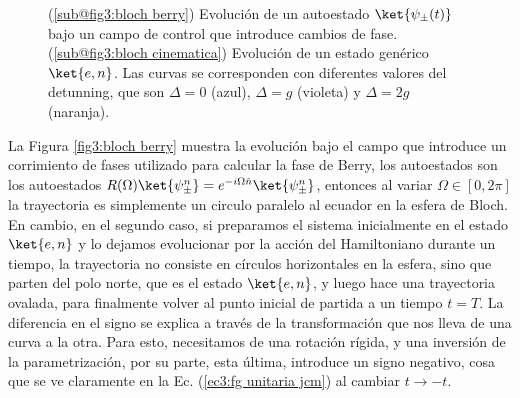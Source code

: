 \begin{figure}[H]
\begin{subfigure}[h]{0.49\textwidth}
        \caption{}
        \label{fig3:bloch cinematica}
    \end{subfigure}
    \caption{(\ref{sub@fig3:bloch berry}) Evolución de un autoestado $\ket{\psi_\pm(t)}$ bajo un campo de control que introduce cambios de fase. (\ref{sub@fig3:bloch cinematica}) Evolución de un estado genérico $\ket{e,n}$. Las curvas se corresponden con diferentes valores del detunning, que son $\Delta=0$ (azul), $\Delta=g$ (violeta) y $\Delta=2g$ (naranja).}
    \label{fig3:esfera de bloch jcm}
\end{figure}
La Figura \ref{fig3:bloch berry} muestra la evolución bajo el campo que introduce un corrimiento de fases utilizado para calcular la fase de Berry, los autoestados son los autoestados $R(\Omega)\ket{\psi_\pm^n}=e^{-i\Omega \hat n}\ket{\psi_\pm^n}$, entonces al variar $\Omega\in [0,2\pi]$ la trayectoria es simplemente un circulo paralelo al ecuador en la esfera de Bloch. En cambio, en el segundo caso, si preparamos el sistema inicialmente en el estado $\ket{e,n}$ y lo dejamos evolucionar por la acción del Hamiltoniano durante un tiempo, la trayectoria no consiste en círculos horizontales en la esfera, sino que parten del polo norte, que es el estado $\ket{e,n}$, y luego hace una trayectoria ovalada, para finalmente volver al punto inicial de partida a un tiempo $t=T$. La diferencia en el signo se explica a través de la transformación que nos lleva de una curva a la otra. Para esto, necesitamos de una rotación rígida, y una inversión de la parametrización, por su parte, esta última, introduce un signo negativo, cosa que se ve claramente en la Ec. (\ref{ec3:fg unitaria jcm}) al cambiar $t\rightarrow -t$.

